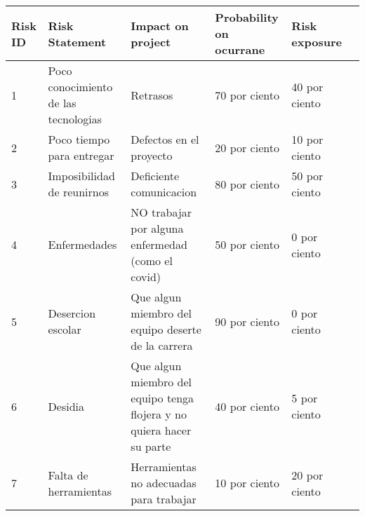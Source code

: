 \documentclass{article}
\begin{document}
\begin{tabular}{|p{2cm}|p{2cm}|p{2cm}| p{2cm}| p{2cm}| p{2cm}|}
\hline 	
Risk ID& Risk Statement& Impact on project&Probability on ocurrane & Risk exposure  \\\hline 

1& Poco conocimiento de las tecnologias & Retrasos& 70 por ciento & 40 por ciento \\\hline 

2& Poco tiempo para entregar& Defectos en el proyecto& 20 por ciento & 10 por ciento \\\hline 

3& Imposibilidad de reunirnos& Deficiente comunicacion& 80 por ciento & 50 por ciento \\\hline 

4& Enfermedades& NO trabajar por alguna enfermedad (como el covid)& 50 por ciento & 0 por ciento \\\hline 

5& Desercion escolar& Que algun miembro del equipo deserte de la carrera& 90 por ciento & 0 por ciento \\\hline 

6& Desidia& Que algun miembro del equipo tenga flojera y no quiera hacer su parte& 40 por ciento & 5 por ciento \\\hline 

7& Falta de herramientas & Herramientas no adecuadas para trabajar& 10 por ciento & 20 por ciento \\\hline 









	
\end{tabular} 
\end{document}
